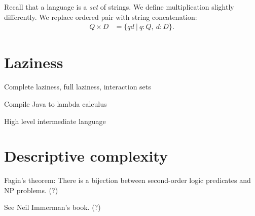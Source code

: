 Recall that a language is a \emph{set} of strings.
We define multiplication slightly differently.
We replace ordered pair with string concatenation:
\begin{align}
    Q \times D &= \{ qd ~|~ q : Q, ~ d : D \}.
\end{align}

\section{Laziness}

Complete laziness, full laziness, interaction sets

Compile Java to lambda calculus

High level intermediate language

\section{Descriptive complexity}

Fagin's theorem:
There is a bijection between second-order logic predicates and NP problems. (?)

See Neil Immerman's book. (?)
